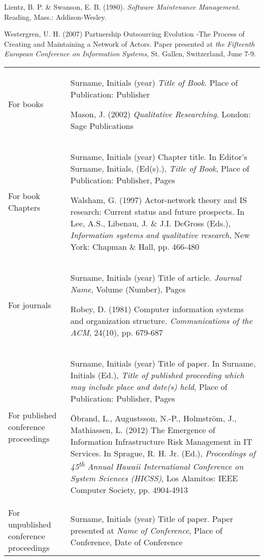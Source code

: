 \documentclass[]{article}
\begin{document}
Lientz, B. P. \& Swanson, E. B. (1980). \emph{Software Maintenance
Management}. Reading, Mass.: Addison-Wesley.

Westergren, U. H. (2007) Partnership Outsourcing Evolution -The Process
of Creating and Maintaining a Network of Actors. Paper presented at
\emph{the Fifteenth European Conference on Information Systems}, St.
Gallen, Switzerland, June 7-9.

\begin{longtable}[]{@{}
  >{\raggedright\arraybackslash}p{}
  >{\raggedright\arraybackslash}p{}@{}}
\toprule\noalign{}
\endhead
\bottomrule\noalign{}
\endlastfoot
For books & Surname, Initials (year) \emph{Title of Book}. Place of
Publication: Publisher

Mason, J. (2002) \emph{Qualitative Researching}. London: Sage
Publications \\
For book Chapters & Surname, Initials (year) Chapter title. In Editor's
Surname, Initials, (Ed(s).), \emph{Title of Book}, Place of Publication:
Publisher, Pages

Walsham, G. (1997) Actor-network theory and IS research: Current status
and future prospects. In Lee, A.S., Libenau, J. \& J.I. DeGross (Eds.),
\emph{Information systems and qualitative research}, New York: Chapman
\& Hall, pp. 466-480 \\
For journals & Surname, Initials (year) Title of article. \emph{Journal
Name}, Volume (Number), Pages

Robey, D. (1981) Computer information systems and organization
structure. \emph{Communications of the ACM}, 24(10), pp. 679-687 \\
For published conference proceedings & Surname, Initials (year) Title of
paper. In Surname, Initials (Ed.), \emph{Title of published proceeding
which may include place and date(s) held}, Place of Publication:
Publisher, Pages

Öbrand, L., Augustsson, N.-P., Holmström, J., Mathiassen, L. (2012) The
Emergence of Information Infrastructure Risk Management in IT Services.
In Sprague, R. H. Jr. (Ed.), \emph{Proceedings of 45\textsuperscript{th}
Annual Hawaii International Conference on System Sciences (HICSS)}, Los
Alamitos: IEEE Computer Society, pp. 4904-4913 \\
For unpublished conference proceedings & Surname, Initials (year) Title
of paper. Paper presented at \emph{Name of Conference}, Place of
Conference, Date of Conference


\end{longtable}
\end{document}
